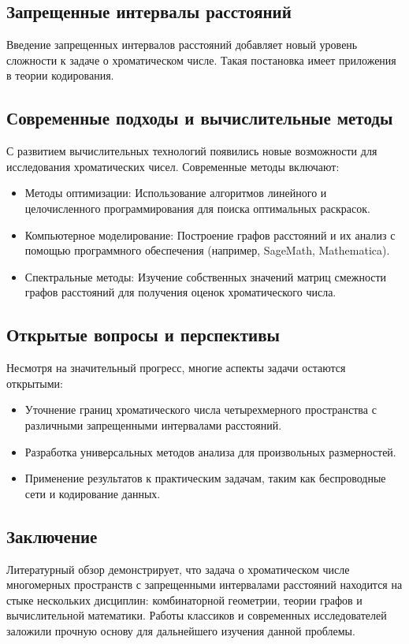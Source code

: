 \documentclass[12pt]{article}
\begin{document}
\subsection{Запрещенные интервалы расстояний}
Введение запрещенных интервалов расстояний добавляет новый уровень сложности к задаче о хроматическом числе. Такая постановка имеет приложения в теории кодирования.


\subsection{Современные подходы и вычислительные методы}
С развитием вычислительных технологий появились новые возможности для исследования хроматических чисел. Современные методы включают:
\begin{itemize}
    \item Методы оптимизации: Использование алгоритмов линейного и целочисленного программирования для поиска оптимальных раскрасок.
    \item Компьютерное моделирование: Построение графов расстояний и их анализ с помощью программного обеспечения (например, SageMath, Mathematica).
    \item Спектральные методы: Изучение собственных значений матриц смежности графов расстояний для получения оценок хроматического числа.
\end{itemize}

\subsection{Открытые вопросы и перспективы}
Несмотря на значительный прогресс, многие аспекты задачи остаются открытыми:
\begin{itemize}
    \item Уточнение границ хроматического числа четырехмерного пространства с различными запрещенными интервалами расстояний.
    \item Разработка универсальных методов анализа для произвольных размерностей.
    \item Применение результатов к практическим задачам, таким как беспроводные сети и кодирование данных.
\end{itemize}

\subsection{Заключение}
Литературный обзор демонстрирует, что задача о хроматическом числе многомерных пространств с запрещенными интервалами расстояний находится на стыке нескольких дисциплин: комбинаторной геометрии, теории графов и вычислительной математики. Работы классиков и современных исследователей заложили прочную основу для дальнейшего изучения данной проблемы. 
\end{document}
